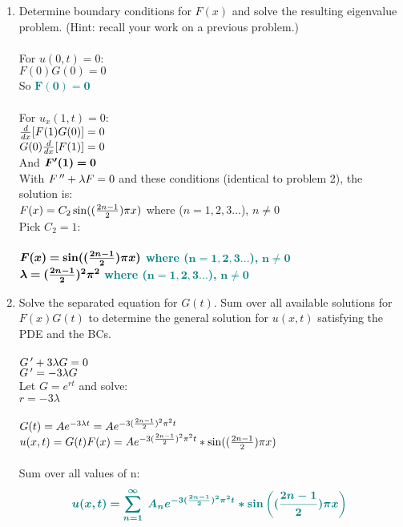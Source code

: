 \documentclass{article}
\begin{document}
\begin{enumerate}
\begin{enumerate}
\item Determine boundary conditions for $F(x)$ and solve the resulting eigenvalue problem.  (Hint: recall your work on a previous problem.)\\\\
For $u(0,t)=0$:\\
$F(0)G(0)=0$\\
So \textcolor{teal}{$\bm{F(0)=0}$}\\\\
For $u_x(1,t)=0$:\\
${d\over dx}[F(1)G(0)]=0$\\
$G(0){d\over dx}[F(1)]=0$\\
And \textcolor{teal}{$\bm{F\sp\prime(1)=0}$}\\

With $F\,\sp{\prime\prime} + \lambda F=0$ and these conditions (identical to problem 2), the solution is:\\
$F(x)=C_2\sin(({2n-1\over2})\pi x)$ where ($n=1,2,3...$), $n\neq 0$\\
Pick $C_2 = 1$:\\\\
\textcolor{teal}{$\bm{F(x)=\sin(({2n-1\over2})\pi x)}$ \textbf{where ($\bm{n=1,2,3...}$),} $\bm{n\neq 0}$\\
$\bm{\lambda = ({2n-1\over2})^2\pi^2}$ \textbf{where ($\bm{n=1,2,3...}$),} $\bm{n\neq 0}$}\\

\item Solve the separated equation for $G(t)$.  Sum over all available solutions for $F(x)G(t)$ to determine the general solution for $u(x,t)$ satisfying the PDE and the BCs.\\\\
$G\,\sp\prime + 3\lambda G = 0$\\
$G\,\sp\prime = -3\lambda G$\\
Let $G=e^{rt}$ and solve:\\
$r = -3\lambda$\\\\
$G(t)= Ae\sp{-3\lambda t} = Ae\sp{-3({2n-1\over2})^2\pi^2 t}$\\
$u(x,t) = G(t)F(x) = Ae\sp{-3({2n-1\over2})^2\pi^2 t} * \sin(({2n-1\over2})\pi x)$\\\\
Sum over all values of n:
\[
\textcolor{teal}{\bm{u(x,t) = \sum_{n=1}^{\infty} \;{ A_ne\sp{-3({2n-1\over2})^2\pi^2 t} * \sin\left(({2n-1\over2})\pi x\right)}\;}}
\]


\end{enumerate}
\end{enumerate}
\end{document}
